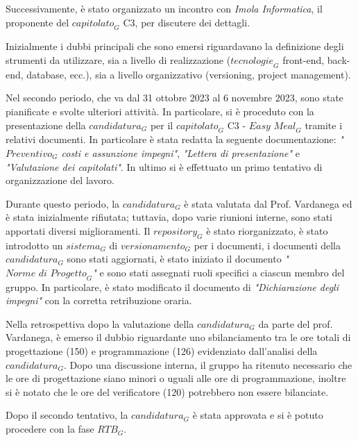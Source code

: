 Successivamente, è stato organizzato un incontro con \emph{Imola Informatica}, il proponente del $\textit{capitolato}_G$ C3, per discutere dei dettagli.

Inizialmente i dubbi principali che sono emersi riguardavano la definizione degli strumenti da utilizzare, sia a livello di realizzazione ($\textit{tecnologie}_G$ front-end, back-end, database, ecc.), sia a livello organizzativo (versioning, project management).

Nel secondo periodo, che va dal 31 ottobre 2023 al 6 novembre 2023, sono state pianificate e svolte ulteriori attività. In particolare, si è proceduto con la presentazione della $\textit{candidatura}_G$ per il $\textit{capitolato}_G$ C3 - $\textit{Easy Meal}_G$ tramite i relativi documenti. In particolare è stata redatta la seguente documentazione: \emph{"$\textit{Preventivo}_G$ costi e assunzione impegni"}, \emph{"Lettera di presentazione"} e \emph{"Valutazione dei capitolati"}. In ultimo si è effettuato un primo tentativo di organizzazione del lavoro.

Durante questo periodo, la $\textit{candidatura}_G$ è stata valutata dal Prof. Vardanega ed è stata inizialmente rifiutata; tuttavia, dopo varie riunioni interne, sono stati apportati diversi miglioramenti. Il $\textit{repository}_G$ è stato riorganizzato, è stato introdotto un $\textit{sistema}_G$ di $\textit{versionamento}_G$ per i documenti, i documenti della $\textit{candidatura}_G$ sono stati aggiornati, è stato iniziato il documento \emph{"$\textit{Norme di Progetto}_G$"} e sono stati assegnati ruoli specifici a ciascun membro del gruppo. In particolare, è stato modificato il documento di \emph{"Dichiarazione degli impegni"} con la corretta retribuzione oraria.

Nella retrospettiva dopo la valutazione della $\textit{candidatura}_G$ da parte del prof. Vardanega, è emerso il dubbio riguardante uno sbilanciamento tra le ore totali di progettazione (150) e programmazione (126) evidenziato dall'analisi della $\textit{candidatura}_G$. Dopo una discussione interna, il gruppo ha ritenuto necessario che le ore di progettazione siano minori o uguali alle ore di programmazione, inoltre si è notato che le ore del verificatore (120) potrebbero non essere bilanciate.

Dopo il secondo tentativo, la $\textit{candidatura}_G$ è stata approvata e si è potuto procedere con la fase $\textit{RTB}_G$. 
